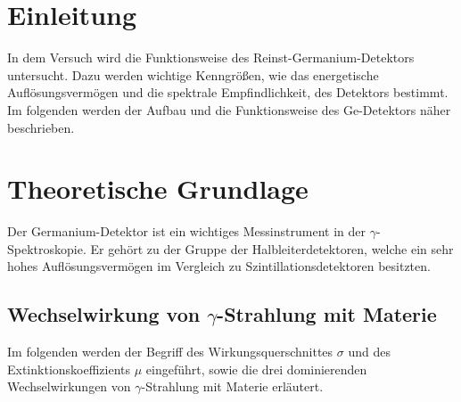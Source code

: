 \section{Einleitung}
In dem Versuch wird die Funktionsweise des Reinst-Germanium-Detektors untersucht. Dazu werden wichtige Kenngrößen, wie das energetische Auflösungsvermögen und die spektrale Empfindlichkeit, des Detektors bestimmt. Im folgenden werden der Aufbau und die Funktionsweise des Ge-Detektors näher beschrieben.

\section{Theoretische Grundlage}
\label{sec:Theorie}
Der Germanium-Detektor ist ein wichtiges Messinstrument in der $\gamma$-Spektroskopie. Er gehört zu der Gruppe der Halbleiterdetektoren, welche ein sehr hohes Auflösungsvermögen im Vergleich zu Szintillationsdetektoren besitzten.



\subsection{Wechselwirkung von \texorpdfstring{$\gamma$}{}-Strahlung mit Materie}
Im folgenden werden der Begriff des Wirkungsquerschnittes $\sigma$ und des Extinktionskoeffizients $\mu$ eingeführt, sowie die drei dominierenden Wechselwirkungen von $\gamma$-Strahlung mit Materie erläutert.



